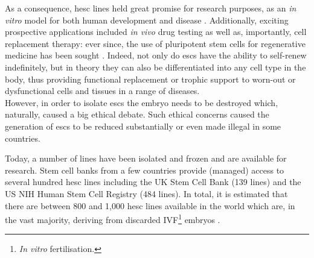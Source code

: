 


As a consequence, \gls{hesc} lines held great promise for research purposes, as an \textit{in vitro} model for both human development and disease \cite{saha2009technical}.
Additionally, exciting prospective applications included \textit{in vivo} drug testing as well as, importantly, cell replacement therapy: ever since, the use of pluripotent stem cells for regenerative medicine has been sought \cite{kimbrel2015current}.
Indeed, not only do \glspl{esc} have the ability to self-renew indefinitely, but in theory they can also be differentiated into any cell type in the body, thus providing functional replacement or trophic support to worn-out or dysfunctional cells and tissues in a range of diseases. \\

However, in order to isolate \glspl{esc} the embryo needs to be destroyed which, naturally, caused a big ethical debate.
Such ethical concerns caused the generation of \glspl{esc} to be reduced substantially or even made illegal in some countries.

Today, a number of lines have been isolated and frozen and are available for research.
Stem cell banks from a few countries provide (managed) access to several hundred \gls{hesc} lines including the UK Stem Cell Bank (139 lines) and the US NIH Human Stem Cell Registry (484 lines).
In total, it is estimated that there are between 800 and 1,000 \gls{hesc} lines available in the world which are, in the vast majority, deriving from discarded IVF\footnote{\textit{In vitro} fertilisation.} embryos \cite{isasi2009governing}.\\


